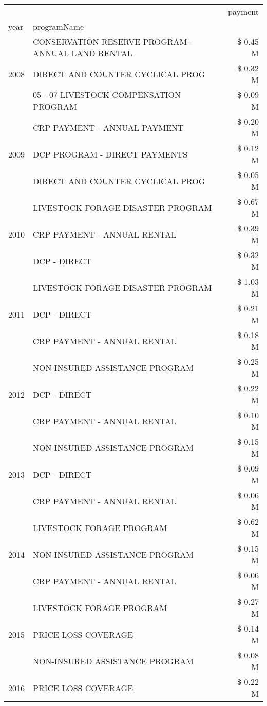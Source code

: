 \begin{tabular}{llr}
\toprule
 &  & payment \\
year & programName &  \\
\midrule
\multirow[t]{3}{*}{2008} & CONSERVATION RESERVE PROGRAM - ANNUAL LAND RENTAL & \$ 0.45 M \\
 & DIRECT AND COUNTER CYCLICAL PROG & \$ 0.32 M \\
 & 05 - 07 LIVESTOCK COMPENSATION PROGRAM & \$ 0.09 M \\
\cline{1-3}
\multirow[t]{3}{*}{2009} & CRP PAYMENT - ANNUAL PAYMENT & \$ 0.20 M \\
 & DCP PROGRAM - DIRECT PAYMENTS & \$ 0.12 M \\
 & DIRECT AND COUNTER CYCLICAL PROG & \$ 0.05 M \\
\cline{1-3}
\multirow[t]{3}{*}{2010} & LIVESTOCK FORAGE DISASTER PROGRAM & \$ 0.67 M \\
 & CRP PAYMENT - ANNUAL RENTAL & \$ 0.39 M \\
 & DCP - DIRECT & \$ 0.32 M \\
\cline{1-3}
\multirow[t]{3}{*}{2011} & LIVESTOCK FORAGE DISASTER PROGRAM & \$ 1.03 M \\
 & DCP - DIRECT & \$ 0.21 M \\
 & CRP PAYMENT - ANNUAL RENTAL & \$ 0.18 M \\
\cline{1-3}
\multirow[t]{3}{*}{2012} & NON-INSURED ASSISTANCE PROGRAM & \$ 0.25 M \\
 & DCP - DIRECT & \$ 0.22 M \\
 & CRP PAYMENT - ANNUAL RENTAL & \$ 0.10 M \\
\cline{1-3}
\multirow[t]{3}{*}{2013} & NON-INSURED ASSISTANCE PROGRAM & \$ 0.15 M \\
 & DCP - DIRECT & \$ 0.09 M \\
 & CRP PAYMENT - ANNUAL RENTAL & \$ 0.06 M \\
\cline{1-3}
\multirow[t]{3}{*}{2014} & LIVESTOCK FORAGE PROGRAM & \$ 0.62 M \\
 & NON-INSURED ASSISTANCE PROGRAM & \$ 0.15 M \\
 & CRP PAYMENT - ANNUAL RENTAL & \$ 0.06 M \\
\cline{1-3}
\multirow[t]{3}{*}{2015} & LIVESTOCK FORAGE PROGRAM & \$ 0.27 M \\
 & PRICE LOSS COVERAGE & \$ 0.14 M \\
 & NON-INSURED ASSISTANCE PROGRAM & \$ 0.08 M \\
\cline{1-3}
\multirow[t]{3}{*}{2016} & PRICE LOSS COVERAGE & \$ 0.22 M \\

\end{tabular}
